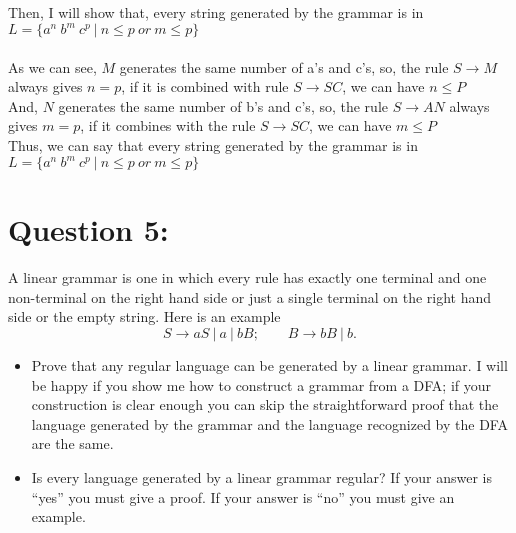 \documentclass [9 pt]{article}
\theoremstyle{definition}
\begin{document}
Then, I will show that, every string generated by the grammar is in $L = \{a^n\ b^m\ c^p \ |\ n \leq p\ or\ m \leq p\} $\\\\
As we can see, $M$ generates the same number of a's and c's, so, the rule $S \to M$ always gives $n = p$, if it is combined with rule $S \to SC$, we can have $n \leq P$\\
And, $N$ generates the same number of b's and c's, so, the rule $S \to AN$ always gives $m = p$, if it combines with the rule $S \to SC$, we can have $m \leq P$\\
Thus, we can say that every string generated by the grammar is in $L = \{a^n\ b^m\ c^p \ |\ n \leq p\ or\ m \leq p\} $





















 \newpage
 \section*{Question 5:}
 A linear grammar is one in which every rule has exactly one terminal and one non-terminal on the right hand side or just a single terminal on the right hand side or the empty string. Here is an example
 $$S \to aS\ |\ a\ |\ bB;\quad\quad B \to bB\ |\ b.$$
 \begin{itemize}
 	\item Prove that any regular language can be generated by a linear grammar. I will be happy if you show me how to construct a grammar from a DFA; if your construction is clear enough you can skip the straightforward proof that the language generated by the grammar and the language recognized by the DFA are the same.
 	\item Is every language generated by a linear grammar regular? If your answer is “yes” you must give a proof. If your answer is “no” you must give an example.

 \end{itemize}
 
 
\end{document}
